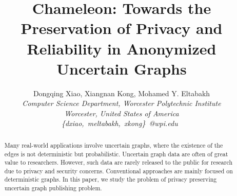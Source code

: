 \documentclass[10pt,conference,letterpaper]{IEEEtran}
\title{Chameleon: Towards the Preservation of Privacy and Reliability in Anonymized Uncertain Graphs}
\author{%
{Dongqing Xiao, Xiangnan Kong, Mohamed Y. Eltabakh}%
\vspace{1.6mm}\\
\fontsize{10}{10}\selectfont\itshape
Computer Science Department, Worcester Polytechnic Institute \\
Worcester, United States of America\\
\fontsize{9}{9}\selectfont\ttfamily\upshape
\{dxiao,~meltabakh,~xkong\}~@wpi.edu\
}
\theoremstyle{plain}
\begin{document}
\maketitle


%

\begin{abstract}  
Many real-world applications involve uncertain graphs, where the existence of the edges is not deterministic but probabilistic. 
Uncertain graph data are often of great value to  researchers. However, such data are rarely released to the public for research due to privacy and security concerns. Conventional approaches are mainly focused on deterministic graphs.  
In this paper, we study the problem of privacy preserving uncertain graph publishing problem. 
\end{abstract}




\end{document}
